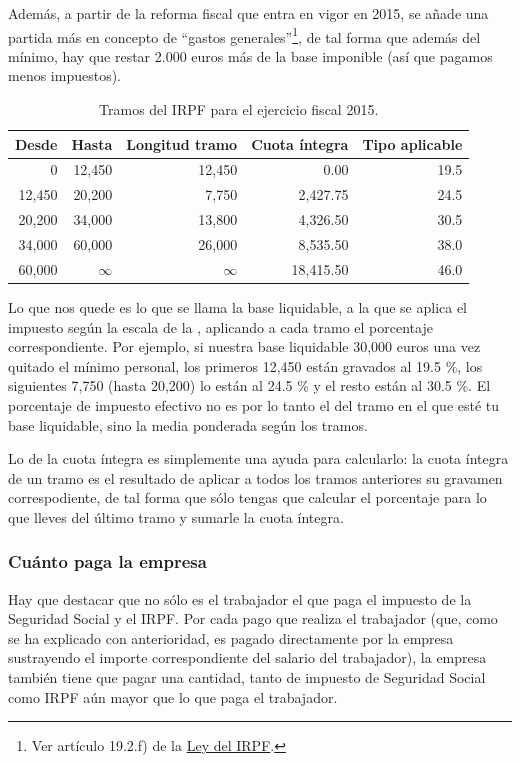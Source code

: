 \documentclass[nochap,palatino,shortheader]{apuntes}
\begin{document}
Además, a partir de la reforma fiscal que entra en vigor en 2015, se añade una partida más en concepto de ``gastos generales''\footnote{Ver artículo 19.2.f) de la \href{https://www.boe.es/buscar/act.php?id=BOE-A-2006-20764&b=29&tn=1&p=20141128}{Ley del IRPF}.}, de tal forma que además del mínimo, hay que restar 2.000 euros más de la base imponible (así que pagamos menos impuestos).

\begin{table}[hbtp]
\centering
\footnotesize
\begin{tabular}{r|r|r|r|r}
\textbf{Desde} & \textbf{Hasta} & \textbf{Longitud tramo} & \textbf{Cuota íntegra} & \textbf{Tipo aplicable} \\ \toprule
0 & 12,450 & 12,450 & 0.00 & 19.5 \\
12,450 & 20,200 & 7,750 & 2,427.75 & 24.5 \\
20,200 & 34,000 & 13,800 & 4,326.50 & 30.5 \\
34,000 & 60,000 & 26,000 & 8,535.50 & 38.0 \\
60,000 & $\infty$ & $\infty$ & 18,415.50 & 46.0 \\
\end{tabular}
\caption{Tramos del IRPF para el ejercicio fiscal 2015.}
\label{tab:Tramos2015IRPF}
\end{table}

Lo que nos quede es lo que se llama la base liquidable, a la que se aplica el impuesto según la escala de la , aplicando a cada tramo el porcentaje correspondiente. Por ejemplo, si nuestra base liquidable 30,000 euros una vez quitado el mínimo personal, los primeros 12,450 están gravados al 19.5 \%, los siguientes 7,750 (hasta 20,200) lo están al 24.5 \% y el resto están al 30.5 \%. El porcentaje de impuesto efectivo no es por lo tanto el del tramo en el que esté tu base liquidable, sino la media ponderada según los tramos.

Lo de la cuota íntegra es simplemente una ayuda para calcularlo: la cuota íntegra de un tramo es el resultado de aplicar a todos los tramos anteriores su gravamen correspodiente, de tal forma que sólo tengas que calcular el porcentaje para lo que lleves del último tramo y sumarle la cuota íntegra.

\subsubsection{Cuánto paga la empresa}
Hay que destacar que no sólo es el trabajador el que paga el impuesto de la Seguridad Social y el IRPF. Por cada pago que realiza el trabajador (que, como se ha explicado con anterioridad, es pagado directamente por la empresa sustrayendo el importe correspondiente del salario del trabajador), la empresa también tiene que pagar una cantidad, tanto de impuesto de Seguridad Social como IRPF aún mayor que lo que paga el trabajador.
\end{document}
